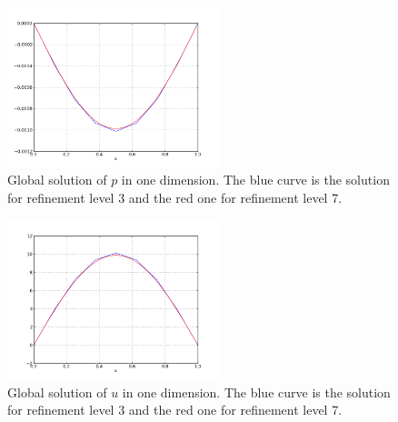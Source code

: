 \documentclass[a4paper, 11pt, twoside]{article}
\begin{document}
\begin{figure}[h!]
	\centering

		\includegraphics[width=0.55\textwidth]{fig/p_distributed_control_poison_tut_1d_lvl_3_7.png}

\caption{Global solution of $p$ in one dimension. The blue curve is the solution for refinement level 3 and the red one for refinement level 7.}
\label{p_1D}
\end{figure}

\begin{figure}[h!]
	\centering
		\includegraphics[width=0.55\textwidth]{fig/u_distributed_control_poison_tut_1d_lvl_3_7.png}
\caption{Global solution of $u$ in one dimension. The blue curve is the solution for refinement level 3 and the red one for refinement level 7.}
\label{u_1D}
\end{figure}

\newpage
\end{document}
